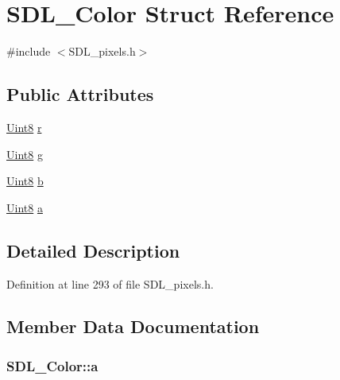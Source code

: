 \hypertarget{struct_s_d_l___color}{\section{S\-D\-L\-\_\-\-Color Struct Reference}
\label{struct_s_d_l___color}
}


{\ttfamily \#include $<$S\-D\-L\-\_\-pixels.\-h$>$}

\subsection*{Public Attributes}
\begin{DoxyCompactItemize}
\item 
\hyperlink{_s_d_l__stdinc_8h_a2944638813a090aa23e62f4da842c3e2}{Uint8} \hyperlink{struct_s_d_l___color_a0bb975b6829524133fdd3c6060cfa63d}{r}
\item 
\hyperlink{_s_d_l__stdinc_8h_a2944638813a090aa23e62f4da842c3e2}{Uint8} \hyperlink{struct_s_d_l___color_ae29d881bf740cfa7078b36e07f85d298}{g}
\item 
\hyperlink{_s_d_l__stdinc_8h_a2944638813a090aa23e62f4da842c3e2}{Uint8} \hyperlink{struct_s_d_l___color_a3b79a27e0414049559aa5bcf241dedd3}{b}
\item 
\hyperlink{_s_d_l__stdinc_8h_a2944638813a090aa23e62f4da842c3e2}{Uint8} \hyperlink{struct_s_d_l___color_ac497ba67af6ecb4d51bdd0945b314526}{a}
\end{DoxyCompactItemize}


\subsection{Detailed Description}


Definition at line 293 of file S\-D\-L\-\_\-pixels.\-h.



\subsection{Member Data Documentation}
\hypertarget{struct_s_d_l___color_ac497ba67af6ecb4d51bdd0945b314526}{
\subsubsection[{a}]{ S\-D\-L\-\_\-\-Color\-::a}}\label{struct_s_d_l___color_ac497ba67af6ecb4d51bdd0945b314526}


